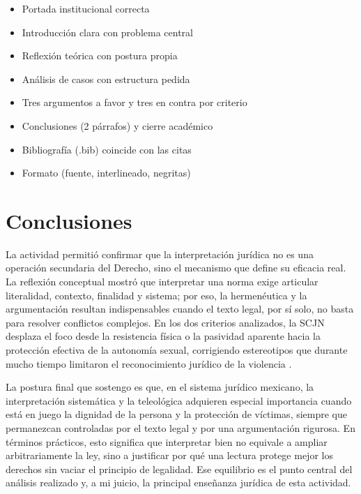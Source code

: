 \documentclass[
	spanish,
	letterpaper, oneside
]{article}
\begin{document}
\begin{itemize}
	\item[\checkmark] Portada institucional correcta
	\item[\checkmark] Introducción clara con problema central
	\item[\checkmark] Reflexión teórica con postura propia
	\item[\checkmark] Análisis de casos con estructura pedida
	\item[\checkmark] Tres argumentos a favor y tres en contra por criterio
	\item[\checkmark] Conclusiones (2 párrafos) y cierre académico
	\item[\checkmark] Bibliografía (.bib) coincide con las citas
	\item[\checkmark] Formato (fuente, interlineado, negritas)
\end{itemize}


\section{Conclusiones}

La actividad permitió confirmar que la interpretación jurídica no es una operación secundaria del Derecho, sino el mecanismo que define su eficacia real. La reflexión conceptual mostró que interpretar una norma exige articular literalidad, contexto, finalidad y sistema; por eso, la hermenéutica y la argumentación resultan indispensables cuando el texto legal, por sí solo, no basta para resolver conflictos complejos. En los dos criterios analizados, la SCJN desplaza el foco desde la resistencia física o la pasividad aparente hacia la protección efectiva de la autonomía sexual, corrigiendo estereotipos que durante mucho tiempo limitaron el reconocimiento jurídico de la violencia \citep{scjnViolenciaFisica2022,scjnIncapacidadResistencia2019}.

La postura final que sostengo es que, en el sistema jurídico mexicano, la interpretación sistemática y la teleológica adquieren especial importancia cuando está en juego la dignidad de la persona y la protección de víctimas, siempre que permanezcan controladas por el texto legal y por una argumentación rigurosa. En términos prácticos, esto significa que interpretar bien no equivale a ampliar arbitrariamente la ley, sino a justificar por qué una lectura protege mejor los derechos sin vaciar el principio de legalidad. Ese equilibrio es el punto central del análisis realizado y, a mi juicio, la principal enseñanza jurídica de esta actividad.
\end{document}
